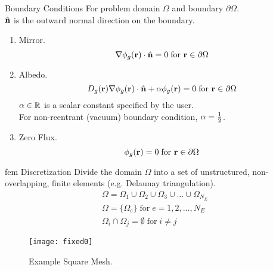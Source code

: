 \begin{frame}{Boundary Conditions}
  For problem domain $\Omega$ and boundary $\partial \Omega$. \\
  $\hat{\mathbf{n}}$ is the outward normal direction on the boundary.
  \begin{enumerate}
    \item Mirror. 
      \begin{equation}
        \mathbf{\nabla} \phi_g(\mathbf{r}) \cdot \hat{\mathbf{n}} = 0 \;  \text{for } 
          \mathbf{r} \in \partial \Omega
      \end{equation}
    \item Albedo. 
      \begin{equation}
        D_g(\mathbf{r}) \mathbf{\nabla} \phi_g(\mathbf{r}) \cdot \hat{\mathbf{n}} + 
          \alpha \phi_g(\mathbf{r})=0 \; \text{for } \mathbf{r} \in \partial \Omega
      \end{equation}
      $\alpha \in \mathbb{R}$ is a scalar constant specified by the user. \\
      For non-reentrant (vacuum) boundary condition, $\alpha = \frac{1}{2}$.
    \item Zero Flux. 
      \begin{equation}
        \phi_g(\mathbf{r}) = 0 \; \text{for } \mathbf{r} \in \partial \Omega
      \end{equation}
  \end{enumerate}
\end{frame}

\begin{frame}{\gls{fem} Discretization}
  Divide the domain $\Omega$ into a set of unstructured, non-overlapping, finite 
  elements (e.g. Delaunay triangulation).
  \begin{gather}
    \label{eq:set_of_elements}
    \Omega = \Omega_1 \cup \Omega_2 \cup \Omega_3 \cup \ldots \cup
      \Omega_{N_E}  \\
    \Omega = \{\Omega_e\} \; \text{for} \; e = 1,2,\ldots,N_E \\
    \Omega_i \cap \Omega_j = \emptyset \; \text{for} \; i \ne j
  \end{gather}
  \begin{figure}
    \centering
    \texttt{[image: fixed0]}
    \caption{Example Square Mesh.}
    \label{fig:fixed0}
  \end{figure}
\end{frame}

